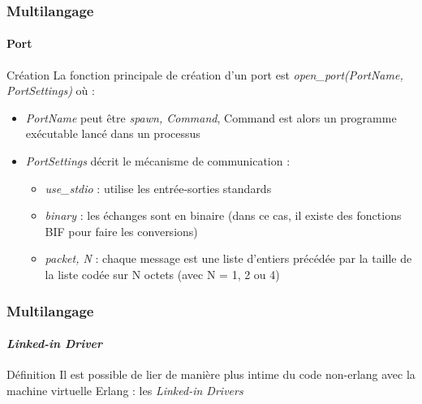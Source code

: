 \begin{frame}[fragile]
  \frametitle{Multilangage}
  \framesubtitle{Port}

  \begin{block}{Création}
    La fonction principale de création d'un port est
    \textit{open\_port(PortName, PortSettings)} où :
    \begin{itemize}
    \item \textit{PortName} peut être \textit{{spawn, Command}}, Command est
      alors un programme exécutable lancé dans un processus
    \item \textit{PortSettings} décrit le mécanisme de communication :
      \begin{itemize}
      \item \textit{use\_stdio} : utilise les entrée-sorties standards
      \item \textit{binary} : les échanges sont en binaire (dans ce cas, il
        existe des fonctions BIF pour faire les conversions)
      \item \textit{{packet, N}} : chaque message est une liste d'entiers
        précédée par la taille de la liste codée sur N octets (avec N = 1, 2
        ou 4)
      \end{itemize}
    \end{itemize}
  \end{block}

\end{frame}

\begin{frame}[fragile]
  \frametitle{Multilangage}
  \framesubtitle{\textit{Linked-in Driver}}

  \begin{alertblock}{Définition}
    Il est possible de lier de manière plus intime du code non-erlang
    avec la machine virtuelle Erlang : les \textit{Linked-in Drivers}
  \end{alertblock}

\end{frame}
